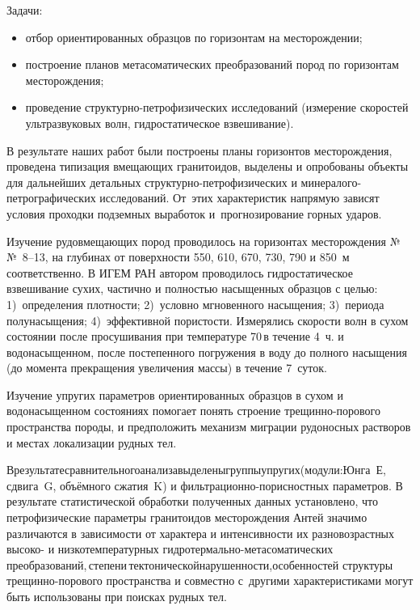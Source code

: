 Задачи:
\begin{itemize}[noitemsep]\vspace{-8pt}
  \item отбор ориентированных образцов по горизонтам на месторождении;
  \item построение планов метасоматических преобразований пород по горизонтам месторождения;
  \item проведение структурно-петрофизических исследований (измерение скоростей ультразвуковых волн, гидростатическое взвешивание).
\end{itemize}
 \vspace{-8pt}

В результате наших работ были построены планы горизонтов месторождения, проведена типизация вмещающих гранитоидов, выделены и опробованы объекты для дальнейших детальных структурно-петрофизических и минералого-петрографических исследований. От~этих характеристик напрямую зависят условия проходки подземных выработок и~прогнозирование горных ударов.

Изучение рудовмещающих пород проводилось на горизонтах месторождения №№~8--13, на глубинах от поверхности 550, 610, 670, 730, 790 и 850~м соответственно. В ИГЕМ РАН автором проводилось гидростатическое взвешивание сухих, частично и полностью насыщенных образцов с целью: 1)~определения плотности; 2)~условно мгновенного насыщения; 3)~периода полунасыщения; 4)~эффективной пористости.
Измерялись скорости волн в сухом состоянии после просушивания при температуре 70\,\dgc в течение 4~ч. и водонасыщенном, после постепенного погружения в воду до полного насыщения (до момента прекращения увеличения массы) в течение 7~суток.

Изучение упругих параметров ориентированных образцов в сухом и водонасыщенном состояниях помогает понять строение трещинно-порового пространства породы, и предположить механизм миграции рудоносных растворов и местах локализации рудных тел.

В\;\;результате\;\;сравнительного\;\;анализа\;\;выделены\;\;группы\;\;упругих\;\;(модули:\;\;Юнга~Е, сдвига~G, объёмного сжатия~K) и фильтрационно-порисностных параметров. В результате статистической обработки полученных данных установлено, что петрофизические параметры гранитоидов месторождения Антей значимо различаются в зависимости от характера и интенсивности их разновозрастных высоко- и низкотемпературных гидротермально-метасоматических\;\;\,преобразований,\;\;\,степени\;\;\,тектонической\;\;нарушенности,\;\;особенностей структуры трещинно-порового пространства и совместно с~другими характеристиками могут быть использованы при поисках рудных тел.

